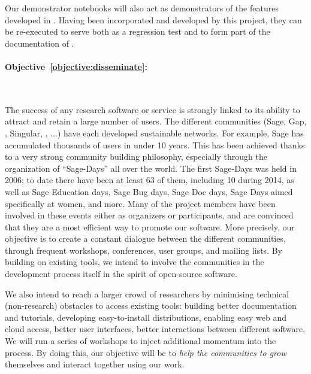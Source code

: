 \documentclass[noworkareas,deliverables,\classoptions]{euproposal}       %
\begin{document}
\begin{proposal}
Our demonstrator notebooks will also act as demonstrators of the
features developed in \TheProject. Having been incorporated and
developed by this project, they can be re-executed to serve both as a
regression test and to form part of the documentation of \TheProject.



\paragraph{Objective~\ref{objective:disseminate}: }\ 

The success of any research software or service is strongly linked to
its ability to attract and retain a large number of users. The
different communities (Sage, Gap, \PariGP, Singular, \Jupyter, ...)
have each developed sustainable networks. For example, Sage has
accumulated thousands of users in under 10 years. This has been
achieved thanks to a very strong community building philosophy,
especially through the organization of ``Sage-Days'' all over the
world. The first Sage-Days was held in 2006; to date there have been
at least 63 of them, including 10 during 2014, as well as Sage
Education days, Sage Bug days, Sage Doc days, Sage Days aimed
specifically at women, and more. Many of the \TheProject{} project
members have been involved in these events either as organizers or
participants, and are convinced that they are a most efficient way to
promote our software. More precisely, our objective is to create a
constant dialogue between the different communities, through frequent
workshops, conferences, user groups, and mailing lists. By building on
existing tools, we intend to involve the communities in the
development process itself in the spirit of open-source software.

We also intend to reach a larger crowd of researchers by minimising
technical (non-research) obstacles to access existing tools: building
better documentation and tutorials, developing easy-to-install
distributions, enabling easy web and cloud access, better user
interfaces, better interactions between different software.  We will
run a series of workshops to inject additional momentum into the
process. By doing this, our objective will be to \emph{help the
  communities to grow} themselves and interact together using our
work.



\end{proposal}
\end{document}
